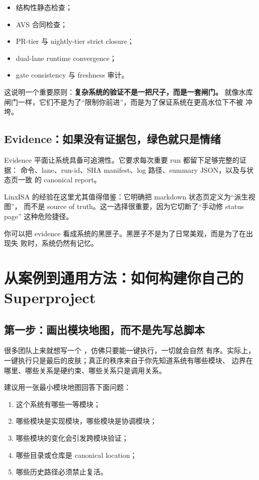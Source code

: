 \documentclass[UTF8,11pt,a4paper,oneside]{ctexbook}
\begin{document}
\begin{itemize}
  \item 结构性静态检查；
  \item AVS 合同检查；
  \item PR-tier 与 nightly-tier strict closure；
  \item dual-lane runtime convergence；
  \item gate consistency 与 freshness 审计。
\end{itemize}

这说明一个重要原则：\textbf{复杂系统的验证不是一把尺子，而是一套闸门。}
就像水库闸门一样，它们不是为了“限制你前进”，而是为了保证系统在更高水位下不被
冲垮。

\section{Evidence：如果没有证据包，绿色就只是情绪}

Evidence 平面让系统具备可追溯性。它要求每次重要 run 都留下足够完整的证据：
命令、lane、run-id、SHA manifest、log 路径、summary JSON，以及与状态页一致
的 canonical report。

LinxISA 的经验在这里尤其值得借鉴：它明确把 markdown 状态页定义为“派生视图”，
而不是 source of truth。这一选择很重要，因为它切断了“手动修 status page”
这种危险捷径。

你可以把 evidence 看成系统的黑匣子。黑匣子不是为了日常美观，而是为了在出现失
败时，系统仍然有记忆。

\chapter{从案例到通用方法：如何构建你自己的 Superproject}

\section{第一步：画出模块地图，而不是先写总脚本}

很多团队上来就想写一个 ，仿佛只要能一键执行，一切就会自然
有序。实际上，一键执行只是最后的皮肤；真正的秩序来自于你先知道系统有哪些模块、
边界在哪里、哪些关系是硬约束、哪些关系只是调用关系。

建议用一张最小模块地图回答下面问题：

\begin{enumerate}
  \item 这个系统有哪些一等模块；
  \item 哪些模块是实现模块，哪些模块是协调模块；
  \item 哪些模块的变化会引发跨模块验证；
  \item 哪些目录或仓库是 canonical location；
  \item 哪些历史路径必须禁止复活。
\end{enumerate}
\end{document}
